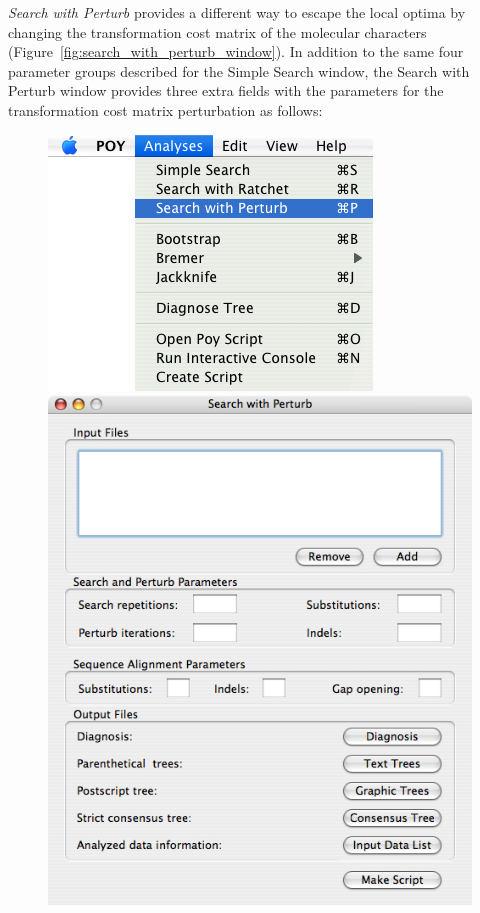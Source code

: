 \emph{Search with Perturb} provides a different way to escape the local optima by changing
the transformation cost matrix of the molecular characters
(Figure~\ref{fig:search_with_perturb_window}). In addition to the
same four parameter groups described for the Simple Search window, the Search
with Perturb window provides three extra fields with the parameters for the
transformation cost matrix perturbation as follows:

\begin{figure}
\centering
\begin{minipage}[c]{0.48\textwidth}
   		\includegraphics[width=\textwidth]{figures/SearchWithPerturb_Menu.jpg}
\end{minipage}
\quad
\begin{minipage}[c]{0.48\textwidth}
	   	\includegraphics[width=\textwidth]{figures/SearchWithPerturb_Window.jpg}

\end{minipage}
\end{figure}
